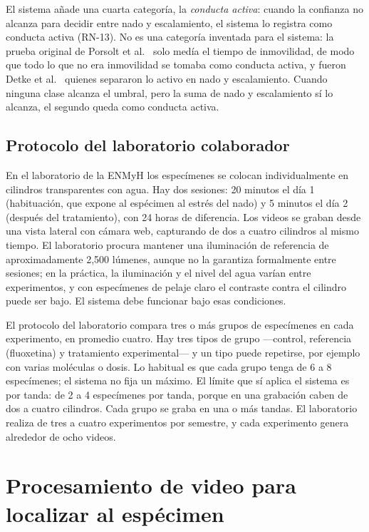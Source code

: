 El sistema añade una cuarta categoría, la \textit{conducta activa}: cuando la confianza no
alcanza para decidir entre nado y escalamiento, el sistema lo registra como conducta activa (RN-13). No
es una categoría inventada para el sistema: la prueba original de Porsolt et al.\
\cite{porsolt1977,porsolt1978} solo medía el tiempo de inmovilidad, de modo que todo lo que no era
inmovilidad se tomaba como conducta activa, y fueron Detke et al.\ \cite{detke1995} quienes
separaron lo activo en nado y escalamiento. Cuando ninguna clase alcanza el umbral, pero la suma de nado y escalamiento sí lo alcanza, el segundo queda como conducta activa.

\subsection{Protocolo del laboratorio colaborador}

En el laboratorio de la ENMyH los especímenes se colocan individualmente en cilindros
transparentes con agua. Hay dos sesiones: 20 minutos el día 1 (habituación, que expone al espécimen al estrés
del nado) y 5 minutos el día 2 (después del tratamiento), con 24 horas de diferencia. Los videos se graban
desde una vista lateral con cámara web, capturando de dos a cuatro cilindros al mismo
tiempo. El laboratorio procura mantener una iluminación de referencia de aproximadamente 2,500
lúmenes, aunque no la garantiza formalmente entre sesiones; en la práctica, la iluminación
y el nivel del agua varían entre experimentos, y con especímenes
de pelaje claro el contraste contra el cilindro puede ser bajo. El sistema debe funcionar
bajo esas condiciones.

El protocolo del laboratorio compara tres o más grupos de especímenes en cada experimento, en promedio cuatro.
Hay tres tipos de grupo ---control, referencia (fluoxetina) y tratamiento experimental--- y un tipo puede repetirse,
por ejemplo con varias moléculas o dosis. Lo habitual es que cada grupo tenga de 6 a 8 especímenes; el sistema no
fija un máximo. El límite que sí aplica el sistema es por tanda: de 2 a 4 especímenes por tanda, porque en una
grabación caben de dos a cuatro cilindros. Cada grupo se graba en una o más tandas. El laboratorio realiza de tres a
cuatro experimentos por semestre, y cada experimento genera alrededor de ocho videos.

\section{Procesamiento de video para localizar al espécimen}

